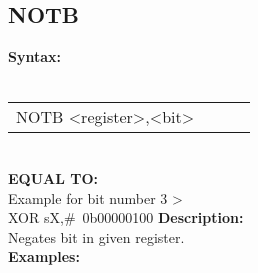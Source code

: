                 \subsection{NOTB}
                \textbf{Syntax:}\\
                \\ {
                    \texttt{}
                    \begin{tabular}[h!]{llll}
                            { \color{highlight_instruction} NOTB    } { \color{highlight_symbol} <register>,<bit> }
                            { \color{highlight_comment}  }\\
                    \end{tabular}
                    }\\
                    \textbf{EQUAL TO:}\\
                    Example for bit number 3 >\\
                    { \color{highlight_instruction} XOR    } { \color{highlight_symbol}      sX,\#~0b00000100 }
                \textbf{Description:}\\
                Negates bit in given register.\\
                \textbf{Examples:}\\
                        \begin{code}[h!]
                            symbol}\verb'NOTB          s0,#3' }\\
                        \end{code}

